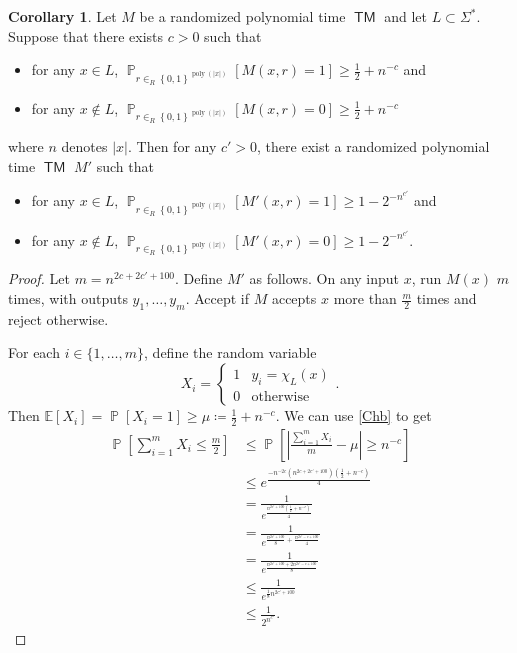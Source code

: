 \documentclass[10pt,letterpaper,cm]{nupset}
\theoremstyle{definition}
\theoremstyle{theorem}
\newtheorem{corollary}[definition]{Corollary}
\theoremstyle{remark}
\newcommand{\E}{\mathbb E}
\newcommand{\1}{\mathbf{1}}
\newcommand{\0}{\vec 0}
\DeclareMathOperator{\pr}{\mathbb{P}}
\DeclareMathOperator{\TM}{\mathsf{TM}}
\DeclareMathOperator{\poly}{poly}
\begin{document}
\begin{corollary}
Let $M$ be a randomized polynomial time $\TM$ and let $L\subset \Sigma^{\ast}$. Suppose that there exists $c>0$ such that
\begin{itemize}
\item for any $x\in L$, $\pr_{r\in_R \left\{0,1\right\}^{\poly(\left\lvert{x}\right\rvert)}}\left[M(x,r)=1\right] \geq \frac{1}{2} +n^{-c}$ and
\item for any $x\notin L$, $\pr_{r\in_R \left\{0,1\right\}^{\poly(\left\lvert{x}\right\rvert)}}\left[M(x,r)=0\right] \geq \frac{1}{2} + n^{-c}$
\end{itemize} where $n$ denotes $\left\lvert{x}\right\rvert$.
Then for any $c' >0$, there exist a randomized polynomial time $\TM$ $M'$ such that 
\begin{itemize}
\item for any $x\in L$, $\pr_{r\in_R \left\{0,1\right\}^{\poly(\left\lvert{x}\right\rvert)}}\left[M'(x,r)=1\right] \geq 1 - 2^{{-}n^{c'}}$ and
\item for any $x\notin L$, $\pr_{r\in_R \left\{0,1\right\}^{\poly(\left\lvert{x}\right\rvert)}}\left[M'(x,r)=0\right] \geq 1 - 2^{{-}n^{c'}}$.
\end{itemize}
\end{corollary}
\begin{proof}
Let $m = n^{2c + 2c' + 100}$. Define $M'$ as follows. On any input $x$, run $M(x)$ $m$ times, with outputs $y_1, \ldots, y_m$. Accept if $M$ accepts $x$ more than $\frac{m}{2}$ times and reject otherwise.

\medskip

  For each $i\in \{1, \ldots, m\}$, define the random variable $$ X_i = \begin{cases} 1 & y_i = \chi_L(x) \\ 0 & \text{otherwise} \end{cases} .$$ Then $\E[X_i] = \pr[X_i=1] \geq \mu\coloneqq \frac{1}{2} + n^{{-}c}$. We can use \cref{Chb} to get   
\begin{align*}
 \pr\left[\sum_{i=1}^m X_i \leq \frac{m}{2}\right] & \leq \pr\left[ \left\lvert{\frac{\sum_{i=1}^m X_i}{m} -\mu}\right\rvert \geq n^{-c}\right] 
\\ & \leq
 e^{ \frac{ {-}n^{{-2}c}(n^{2c + 2c' + 100})(\frac{1}{2}+ n^{-c})}{4}
 }
 \\ & = \frac{1}{e^{\frac{ n^{2c' +100}(\frac{1}{2} + n^{{-}c} )                 }{  4   }}  }
 \\ & = \frac{1}{e^{ \frac{n^{2c' +100}}{8} +\frac{n^{2c' -c+100}}{4}          }}
 \\ & =  \frac{1}{e^{ \frac{n^{2c' +100} + 2 n^{2c' -c+100}}{8}       }}
 \\ &
 \leq \frac{1}{e^{\frac{1}{8}n^{2c' +100}}   }
 \\ & \leq \frac{1}{2^{n^{c'}}} . 
\end{align*} 
\end{proof}
\end{document}
